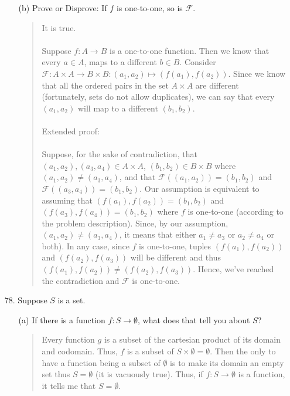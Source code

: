 \documentclass[12pt, a4paper]{article}
\begin{document}
\begin{itemize}
\begin{itemize}
\item[(b)]
Prove or Disprove: If $f$ is one-to-one, so is $\mathcal{F}$.
\begin{quote}
It is true.\\\\
Suppose $f : A \rightarrow B$ is a one-to-one function. Then we know that every $a \in A$,
maps to a different $b \in B$. Consider $\mathcal{F} : A \times A \rightarrow B \times B : (a_1, a_2) \mapsto (f(a_1), f(a_2))$.
Since we know that all the ordered pairs in the set $A \times A$ are different (fortunately, sets do not allow duplicates),
we can say that every $(a_1, a_2)$ will map to a different $(b_1, b_2)$.\\\\
Extended proof:\\\\
Suppose, for the sake of contradiction, that $(a_1, a_2), (a_3, a_4) \in A \times A$, $(b_1, b_2) \in B \times B$ where $(a_1, a_2) \neq (a_3, a_4)$, and
that $\mathcal{F}((a_1, a_2)) =(b_1, b_2)$ and $\mathcal{F}((a_3, a_4)) =(b_1, b_2)$. Our assumption is equivalent to assuming
that $(f(a_1), f(a_2)) =(b_1, b_2)$ and $(f(a_3), f(a_4)) = (b_1, b_2)$ where $f$ is one-to-one (according to the problem description).
Since, by our assumption, $(a_1, a_2) \neq (a_3, a_4)$, it means that either $a_1 \neq a_3$ or $a_2 \neq a_4$ or both). In any case, since $f$ is one-to-one,
tuples $(f(a_1), f(a_2))$ and $(f(a_2), f(a_3))$ will be different and thus $(f(a_1), f(a_2)) \neq (f(a_2), f(a_3))$.
Hence, we've reached the contradiction and $\mathcal{F}$ is one-to-one.
\end{quote}

\end{itemize}

\item[]
\item[]

\item[78.]
Suppose $S$ is a set.
\begin{itemize}
\item[(a)]
If there is a function $f : S \rightarrow \emptyset$, what does that tell you about $S$?
\begin{quote}
Every function $g$ is a subset of the cartesian product of its domain and codomain.
Thus, $f$ is a subset of $S \times \emptyset = \emptyset$. Then the only
to have a function being a subset of $\emptyset$ is to make its domain
an empty set thus $S = \emptyset$ (it is vacuously true). Thus, if $f : S \rightarrow \emptyset$ is a function,
it tells me that $S = \emptyset$.
\end{quote}


\end{itemize}
\end{itemize}
\end{document}
